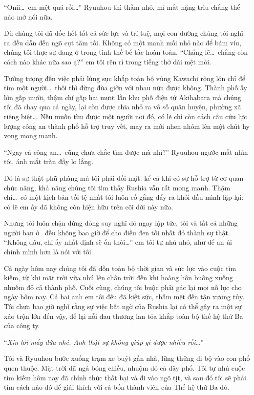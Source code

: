 \documentclass[../main.tex]{subfiles}
\begin{document}
``Onii\dots\ em mệt quá rồi\dots'' Ryuuhou thì thầm nhỏ, mí mắt nặng trĩu chẳng thể nào mở nổi nữa.

Dù chúng tôi đã dốc hết tất cả sức lực và trí tuệ, mọi con đường chúng tôi nghĩ ra đều dẫn đến ngõ cụt tăm tối. Không có một manh mối nhỏ nào để bám víu, chúng tôi thực sự đang ở trong tình thế bế tắc hoàn toàn. ``Chẳng lẽ\dots\ chẳng còn cách nào khác nữa sao ạ?'' em tôi rên rỉ trong tiếng thở dài mệt mỏi.

Tưởng tượng đến việc phải lùng sục khắp toàn bộ vùng Kawachi rộng lớn chỉ để tìm một người\dots\ thôi thì đừng đùa giỡn với nhau nữa được không. Thành phố ấy lớn gấp mười, thậm chí gấp hai mươi lần khu phố điện tử Akihabara mà chúng tôi đã chạy qua cả ngày, lại còn được chia nhỏ ra vô số quận huyện, phường xã riêng biệt\dots\ Nếu muốn tìm được một người nơi đó, có lẽ chỉ còn cách cầu cứu lực lượng công an thành phố hỗ trợ truy vết, may ra mới nhen nhóm lên một chút hy vọng mong manh.

``Ngay cả công an\dots\ cũng chưa chắc tìm được mà nhỉ?'' Ryuuhou ngước mắt nhìn tôi, ánh mắt tràn đầy lo lắng.

Đó là sự thật phũ phàng mà tôi phải đối mặt: kể cả khi có sự hỗ trợ từ cơ quan chức năng, khả năng chúng tôi tìm thấy Rushia vẫn rất mong manh. Thậm chí\dots\ có một kịch bản tồi tệ nhất tôi luôn cố gắng đẩy ra khỏi đầu mình lặp lại: có lẽ em ấy đã không còn hiện hữu trên cõi đời này nữa.

Nhưng tôi luôn chặn đứng dòng suy nghĩ đó ngay lập tức, tôi và tất cả những người bạn ở \hll\ đều không bao giờ để cho điều đen tối nhất đó thành sự thật. ``Không đâu, chị ấy nhất định sẽ ổn thôi\dots'' em tôi tự nhủ nhỏ, như để an ủi chính mình hơn là nói với tôi.

Cả ngày hôm nay chúng tôi đã dồn toàn bộ thời gian và sức lực vào cuộc tìm kiếm, từ khi mặt trời vừa nhú lên chân trời đến khi hoàng hôn buông xuống nhuốm đỏ cả thành phố. Cuối cùng, chúng tôi buộc phải gác lại mọi nỗ lực cho ngày hôm nay. Cả hai anh em tôi đều đã kiệt sức, thấm mệt đến tận xương tủy.  Tôi chưa bao giờ nghĩ rằng sự việc bất ngờ của Rushia lại có thể gây ra một sự xáo trộn lớn đến vậy, để lại nỗi đau thương lan tỏa khắp toàn bộ thế hệ thứ Ba của công ty.

``\textit{Xin lỗi mấy đứa nhé. Anh thật sự không giúp gì được nhiều rồi\dots}''

\il

Tôi và Ryuuhou bước xuống trạm xe buýt gần nhà, lững thững đi bộ vào con phố quen thuộc. Mặt trời đã ngả bóng chiều, nhuộm đỏ cả dãy phố. Tôi tự nhủ cuộc tìm kiếm hôm nay đã chính thức thất bại và đi vào ngõ tịt, và sau đó tôi sẽ phải tìm cách nào đó để giải thích với cả bốn thành viên của Thế hệ thứ Ba đó.
\end{document}
